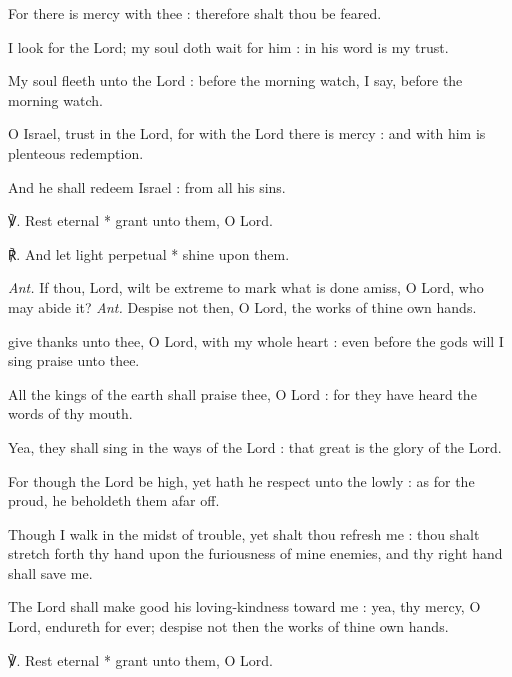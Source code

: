 For there is mercy with thee : therefore shalt thou be feared.\par
{}I look for the Lord; my soul doth wait for him : in his word is my trust.\par
{}My soul fleeth unto the Lord : before the morning watch, I say, before the morning watch.\par
{}O Israel, trust in the Lord, for with the Lord there is mercy : and with him is plenteous redemption.\par
{}And he shall redeem Israel : from all his sins.
\par
℣. Rest eternal * grant unto them, O Lord.\par
℟. And let light perpetual * shine upon them.\par\noindent
\textit{Ant.} If thou, Lord, wilt be extreme to mark what is done amiss, O Lord, who may abide it?
\noindent
\textit{Ant.} Despise not then, {\dag} O Lord, the works of thine own hands.\par
{} give thanks unto thee, O Lord, with my whole heart : even before the gods will I sing praise unto thee.\par
{}
All the kings of the earth shall praise thee, O Lord : for they have heard the words of thy mouth.\par
{}Yea, they shall sing in the ways of the Lord : that great is the glory of the Lord.\par
{}For though the Lord be high, yet hath he respect unto the lowly : as for the proud, he beholdeth them afar off.\par
{}Though I walk in the midst of trouble, yet shalt thou refresh me : thou shalt stretch forth thy hand upon the furiousness of mine enemies, and thy right hand shall save me.\par
{}The Lord shall make good his loving-kindness toward me : yea, thy mercy, O Lord, endureth for ever; despise not then the works of thine own hands.
\par
℣. Rest eternal * grant unto them, O Lord.\par
